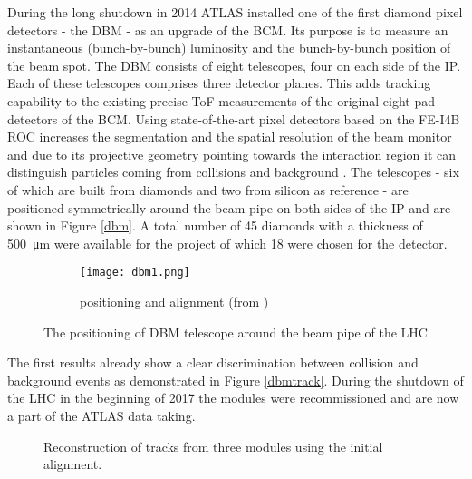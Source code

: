 During the long shutdown in 2014 ATLAS installed one of the first diamond pixel detectors - the \ac{DBM} - as an upgrade of the \ac{BCM}. Its purpose is to measure an instantaneous (bunch-by-bunch) luminosity and the bunch-by-bunch position of the beam spot. The \ac{DBM} consists of eight telescopes, four on each side of the \ac{IP}. Each of these telescopes comprises three detector planes. This adds tracking capability to the existing precise \ac{ToF} measurements of the original eight pad detectors of the \ac{BCM}. Using state-of-the-art pixel detectors based on the FE-I4B \ac{ROC} \cite{malte} increases the segmentation and the spatial resolution of the beam monitor and due to its projective geometry pointing towards the interaction region it can distinguish particles coming from collisions and background \cite{dbm}. The telescopes - six of which are built from \pcvd diamonds and two from silicon as reference - are positioned symmetrically around the beam pipe on both sides of the \ac{IP} and are shown in Figure \vref{dbm}. A total number of 45 diamonds with a thickness of \SI{500}{\micro\meter} were available for the project of which 18 were chosen for the detector.

\begin{figure}
	\centering
	\begin{subfigure}{.66\textwidth}
		\centering
		\vspace*{.05\textheight}
		\texttt{[image: dbm1.png]}
		\vspace*{.02\textheight}
		\caption{positioning and alignment (from \cite{dbm})}
	\end{subfigure}
	\caption{The positioning of \ac{DBM} telescope around the beam pipe of the \ac{LHC}}
	\label{dbm}
\end{figure}

\noindent
The first results already show a clear discrimination between collision and background events as demonstrated in Figure \vref{dbmtrack}. During the shutdown of the \ac{LHC} in the beginning of 2017 the modules were recommissioned and are now a part of the ATLAS data taking.

\begin{figure}
	\centering
	\caption{Reconstruction of tracks from three modules using the initial alignment.}
	\label{dbmtrack}
\end{figure}

